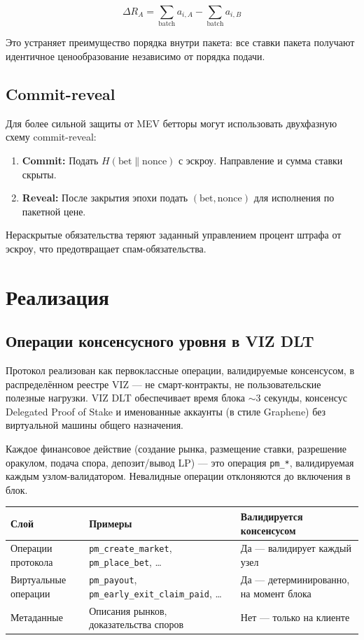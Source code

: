 \documentclass{ledger}
\theoremstyle{plain}
\theoremstyle{remark}
\begin{document}
\[
\Delta R_A = \sum_{\text{batch}} a_{i,A} - \sum_{\text{batch}} a_{i,B}
\]

Это устраняет преимущество порядка внутри пакета: все ставки пакета получают
идентичное ценообразование независимо от порядка подачи.

\subsection{Commit-reveal}

Для более сильной защиты от MEV бетторы могут использовать двухфазную схему
commit-reveal:

\begin{enumerate}
  \item \textbf{Commit:} Подать $H(\text{bet} \| \text{nonce})$ с эскроу.
  Направление и сумма ставки скрыты.
  \item \textbf{Reveal:} После закрытия эпохи подать $(\text{bet},
  \text{nonce})$ для исполнения по пакетной цене.
\end{enumerate}

Нераскрытые обязательства теряют заданный управлением процент штрафа от эскроу, что
предотвращает спам-обязательства.

\section{Реализация}\label{sec:impl}

\subsection{Операции консенсусного уровня в VIZ DLT}

Протокол реализован как первоклассные операции, валидируемые консенсусом, в
распределённом реестре VIZ --- не смарт-контракты, не пользовательские полезные
нагрузки. VIZ DLT обеспечивает время блока ${\sim}3$ секунды, консенсус Delegated
Proof of Stake и именованные аккаунты (в стиле Graphene) без виртуальной машины
общего назначения.

Каждое финансовое действие (создание рынка, размещение ставки, разрешение оракулом,
подача спора, депозит/вывод LP) --- это операция \texttt{pm\_*}, валидируемая каждым
узлом-валидатором. Невалидные операции отклоняются до включения в блок.

\begin{center}
\begin{tabular}{lll}
\hline
\textbf{Слой} & \textbf{Примеры} & \textbf{Валидируется консенсусом} \\
\hline
Операции протокола & \texttt{pm\_create\_market}, \texttt{pm\_place\_bet}, \ldots & Да --- валидирует каждый узел \\
Виртуальные операции & \texttt{pm\_payout}, \texttt{pm\_early\_exit\_claim\_paid}, \ldots & Да --- детерминированно, на момент блока \\
Метаданные & Описания рынков, доказательства споров & Нет --- только на клиенте \\
\hline
\end{tabular}
\end{center}
\end{document}
